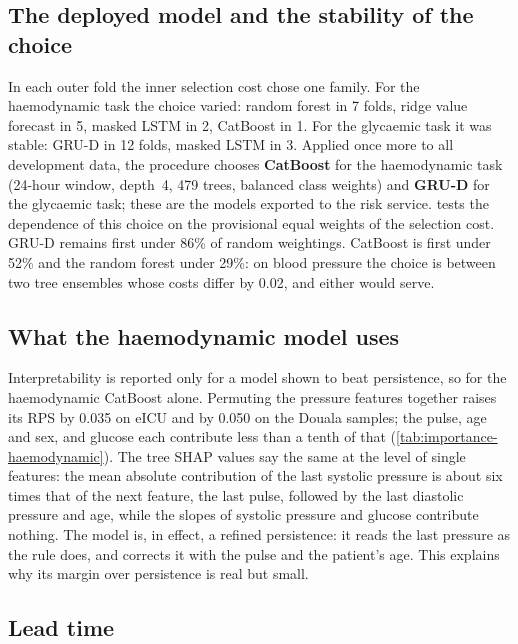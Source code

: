 \subsection{The deployed model and the stability of the choice}

In each outer fold the inner selection cost chose one family. For the haemodynamic task the choice varied: random forest in 7 folds, ridge value forecast in 5, masked LSTM in 2, CatBoost in 1. For the glycaemic task it was stable: GRU-D in 12 folds, masked LSTM in 3. Applied once more to all development data, the procedure chooses \textbf{CatBoost} for the haemodynamic task (24-hour window, depth~4, 479 trees, balanced class weights) and \textbf{GRU-D} for the glycaemic task; these are the models exported to the risk service.  tests the dependence of this choice on the provisional equal weights of the selection cost. GRU-D remains first under 86\% of random weightings. CatBoost is first under 52\% and the random forest under 29\%: on blood pressure the choice is between two tree ensembles whose costs differ by 0.02, and either would serve.



\subsection{What the haemodynamic model uses}

Interpretability is reported only for a model shown to beat persistence, so for the haemodynamic CatBoost alone. Permuting the pressure features together raises its RPS by 0.035 on eICU and by 0.050 on the Douala samples; the pulse, age and sex, and glucose each contribute less than a tenth of that (\cref{tab:importance-haemodynamic}). The tree SHAP values say the same at the level of single features: the mean absolute contribution of the last systolic pressure is about six times that of the next feature, the last pulse, followed by the last diastolic pressure and age, while the slopes of systolic pressure and glucose contribute nothing. The model is, in effect, a refined persistence: it reads the last pressure as the rule does, and corrects it with the pulse and the patient's age. This explains why its margin over persistence is real but small.



\subsection{Lead time}\label{sec:results-leads}

